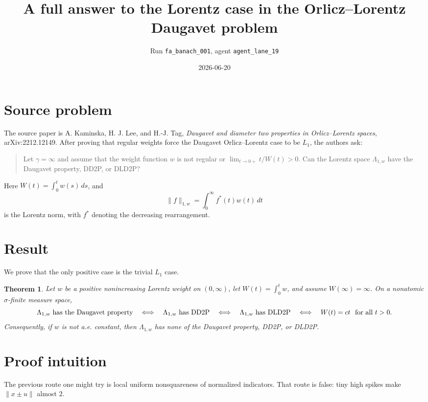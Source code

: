 \documentclass[11pt]{article}
\title{A full answer to the Lorentz case in the Orlicz--Lorentz Daugavet problem}
\author{Run \texttt{fa\_banach\_001}, agent \texttt{agent\_lane\_19}}
\date{2026-06-20}
\newtheorem{theorem}{Theorem}
\begin{document}
\maketitle

\section*{Source problem}

The source paper is A. Kaminska, H. J. Lee, and H.-J. Tag,
\emph{Daugavet and diameter two properties in Orlicz--Lorentz spaces},
arXiv:2212.12149.  After proving that regular weights force the Daugavet
Orlicz--Lorentz case to be \(L_1\), the authors ask:

\begin{quote}
Let \(\gamma=\infty\) and assume that the weight function \(w\) is not regular
or \(\lim_{t\to0+}t/W(t)>0\). Can the Lorentz space \(\Lambda_{1,w}\) have the
Daugavet property, DD2P, or DLD2P?
\end{quote}

Here \(W(t)=\int_0^t w(s)\,ds\), and
\[
  \|f\|_{1,w}=\int_0^\infty f^*(t)w(t)\,dt
\]
is the Lorentz norm, with \(f^*\) denoting the decreasing rearrangement.

\section*{Result}

We prove that the only positive case is the trivial \(L_1\) case.

\begin{theorem}\label{thm:main}
Let \(w\) be a positive nonincreasing Lorentz weight on \((0,\infty)\), let
\(W(t)=\int_0^t w\), and assume \(W(\infty)=\infty\).  On a nonatomic
\(\sigma\)-finite measure space,
\[
 \Lambda_{1,w}\hbox{ has the Daugavet property}
 \quad\Longleftrightarrow\quad
 \Lambda_{1,w}\hbox{ has DD2P}
 \quad\Longleftrightarrow\quad
 \Lambda_{1,w}\hbox{ has DLD2P}
 \quad\Longleftrightarrow\quad
 W(t)=ct\ \hbox{ for all }t>0.
\]
Consequently, if \(w\) is not a.e. constant, then \(\Lambda_{1,w}\) has none
of the Daugavet property, DD2P, or DLD2P.
\end{theorem}

\section*{Proof intuition}

The previous route one might try is local uniform nonsquareness of normalized
indicators.  That route is false: tiny high spikes make
\(\|x\pm u\|\) almost \(2\).
\end{document}
